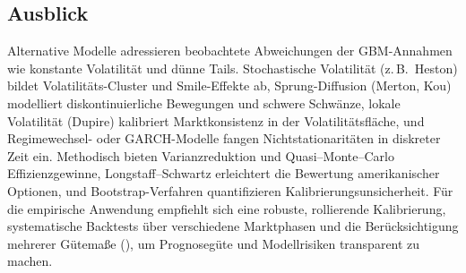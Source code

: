 \subsection{Ausblick}

Alternative Modelle adressieren beobachtete Abweichungen der GBM-Annahmen wie konstante Volatilität
und dünne Tails. Stochastische Volatilität (z.\,B.\ Heston) bildet Volatilitäts-Cluster und 
Smile-Effekte ab, Sprung-Diffusion (Merton, Kou) modelliert diskontinuierliche Bewegungen und 
schwere Schwänze, lokale Volatilität (Dupire) kalibriert Marktkonsistenz in der Volatilitätsfläche,
und Regimewechsel- oder GARCH-Modelle fangen Nichtstationaritäten in diskreter Zeit ein. 
Methodisch bieten Varianzreduktion und Quasi–Monte–Carlo Effizienzgewinne, Longstaff–Schwartz 
erleichtert die Bewertung amerikanischer Optionen, und Bootstrap-Verfahren 
quantifizieren Kalibrierungsunsicherheit. Für die empirische Anwendung empfiehlt sich eine 
robuste, rollierende Kalibrierung, systematische Backtests über verschiedene Marktphasen und die 
Berücksichtigung mehrerer Gütemaße (\cite{Botchkarev}), um Prognosegüte und Modellrisiken transparent zu machen.